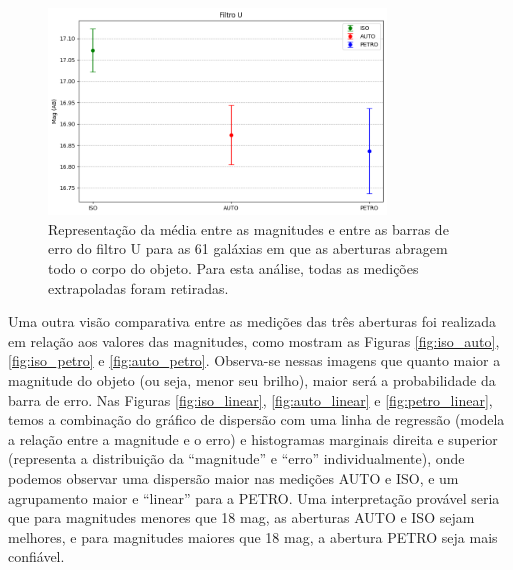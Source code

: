 \begin{figure}[h]
  \centering 
  \includegraphics[width=0.8\textwidth]{Imagens/incerteza_abertura.png} 
  \caption[Média entre as três aberturas e seus respectivos erros para o filtro U.]{Representação da média entre as magnitudes e entre as barras de erro do filtro U para as 61 galáxias em que as aberturas abragem todo o corpo do objeto. Para esta análise, todas as medições extrapoladas foram retiradas.}
  \label{fig:incerteza_abertura} 
\end{figure}

Uma outra visão comparativa entre as medições das três aberturas foi realizada em relação aos valores das magnitudes, como mostram as Figuras \ref{fig:iso_auto}, \ref{fig:iso_petro} e \ref{fig:auto_petro}. Observa-se nessas imagens que quanto maior a magnitude do objeto (ou seja, menor seu brilho), maior será a probabilidade da barra de erro. Nas Figuras \ref{fig:iso_linear}, \ref{fig:auto_linear} e \ref{fig:petro_linear}, temos a combinação do gráfico de dispersão com uma linha de regressão (modela a relação entre a magnitude e o erro) e histogramas marginais direita e superior (representa a distribuição da ``magnitude'' e ``erro'' individualmente), onde podemos observar uma dispersão maior nas medições AUTO e ISO, e um agrupamento maior e ``linear'' para a PETRO. Uma interpretação provável seria que para magnitudes menores que 18 mag, as aberturas AUTO e ISO sejam melhores, e para magnitudes maiores que 18 mag, a abertura PETRO seja mais confiável. 

